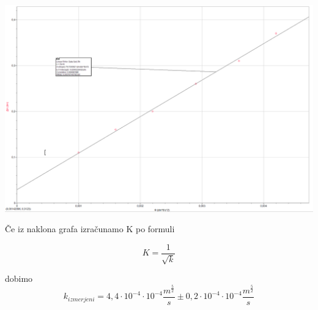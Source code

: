 \documentclass[a4paper]{report}
\begin{document}
\includegraphics[width=\textwidth]{Graf}

Če iz naklona grafa izračunamo K po formuli

\[K=\frac{1}{\sqrt{k}}\]

dobimo \[k_{izmerjeni}=4,4\cdot 10^{-4} \cdot 10^{-4}\frac{m^{\frac{5}{2}}}{s}\pm 0,2\cdot 10^{-4}\cdot 10^{-4}\frac{m^{\frac{5}{2}}}{s}\]
\end{document}

